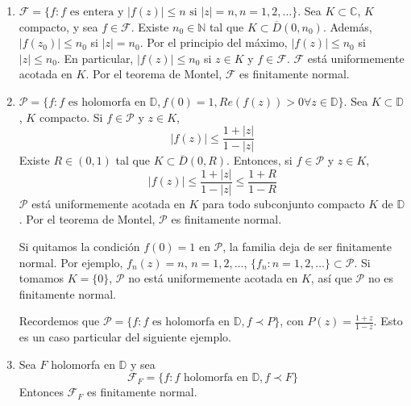 \begin{example}
    \hfill
    \begin{enumerate}
        \item $\mathcal{F} = \{f : f \text{ es entera y } |f(z)| \leq n \text{ si } |z| = n, n = 1, 2, \dots\}$.
              Sea $K \subset \mathbb{C}$, $K$ compacto, y sea $f \in \mathcal{F}$.
              Existe $n_0 \in \mathbb{N}$ tal que $K \subset \overline{D}(0, n_0)$.
              Además, $|f(z_0)| \leq n_0$ si $|z| = n_0$.
              Por el principio del máximo, $|f(z)| \leq n_0$ si $|z| \leq n_0$.
              En particular, $|f(z)| \leq n_0$ si $z \in K$ y $f \in \mathcal{F}$.
              $\mathcal{F}$ está uniformemente acotada en $K$.
              Por el teorema de Montel, $\mathcal{F}$ es finitamente normal.

        \item $\mathcal{P} = \{f : f \text{ es holomorfa en } \mathbb{D}, f(0) = 1, Re(f(z)) > 0 \forall z \in \mathbb{D}\}$.
              Sea $K \subset \mathbb{D}$, $K$ compacto.
              Si $f \in \mathcal{P}$ y $z \in K$,
              $$|f(z)| \leq \frac{1+|z|}{1-|z|}$$
              Existe $R \in (0, 1)$ tal que $K \subset \overline{D}(0, R)$.
              Entonces, si $f \in \mathcal{P}$ y $z \in K$,
              $$|f(z)| \leq \frac{1+|z|}{1-|z|} \leq \frac{1+R}{1-R}$$
              $\mathcal{P}$ está uniformemente acotada en $K$ para todo subconjunto compacto $K$ de $\mathbb{D}$.
              Por el teorema de Montel, $\mathcal{P}$ es finitamente normal.

              \begin{remark}
                  Si quitamos la condición $f(0) = 1$ en $\mathcal{P}$, la familia deja de ser finitamente normal.
                  Por ejemplo, $f_n(z) = n$, $n = 1, 2, \dots$, $\{f_n : n = 1, 2, \dots\} \subset \mathcal{P}$.
                  Si tomamos $K = \{0\}$, $\mathcal{P}$ no está uniformemente acotada en $K$, así que $\mathcal{P}$ no es finitamente normal.
              \end{remark}

              Recordemos que $\mathcal{P} = \{f : f \text{ es holomorfa en } \mathbb{D}, f \prec P\}$, con $P(z) = \frac{1+z}{1-z}$.
              Esto es un caso particular del siguiente ejemplo.

        \item Sea $F$ holomorfa en $\mathbb{D}$ y sea
              $$\mathcal{F}_F = \{f : f \text{ holomorfa en } \mathbb{D}, f \prec F\}$$
              Entonces $\mathcal{F}_F$ es finitamente normal.


\end{enumerate}
\end{example}
